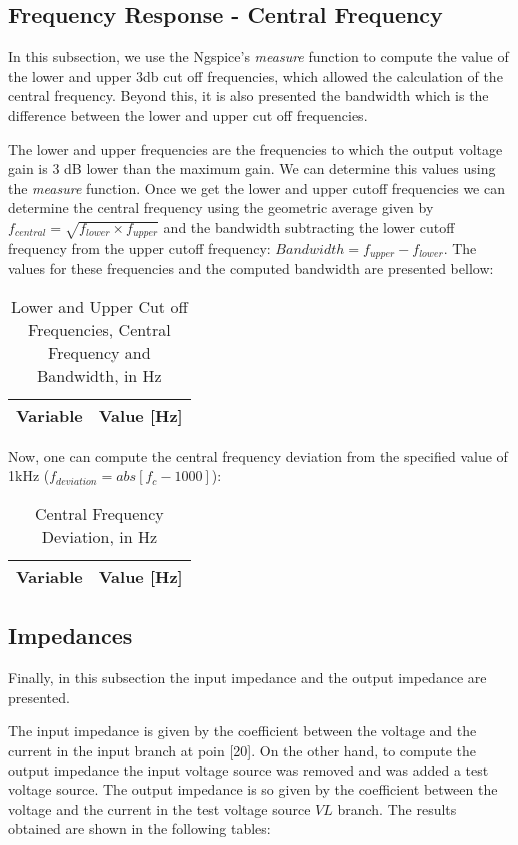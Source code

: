 \subsection{Frequency Response - Central Frequency}
\label{frequency_response}
\par In this subsection, we use the Ngspice's \textit{measure} function to compute the value of the lower and upper 3db cut off frequencies, which allowed the calculation of the central frequency. Beyond this, it is also presented the bandwidth which is the difference between the lower and upper cut off frequencies.
\par The lower and upper frequencies are the frequencies to which the output voltage gain is 3 dB lower than the maximum gain. We can determine this values using the \textit{measure} function. Once we get the lower and upper cutoff frequencies we can determine the central frequency using the geometric average given by $f_{central}=\sqrt{f_{lower}\times f_{upper}}$ and the bandwidth subtracting the lower cutoff frequency from the upper cutoff frequency: $Bandwidth = f_{upper}-f_{lower}$.
The values for these frequencies and the computed bandwidth are presented bellow:

\begin{table}[H]
  \centering
  \begin{tabular}{|l|r|}
    \hline    
    {\bf Variable} & {\bf Value [Hz]} \\ \hline
    
  \end{tabular}
  \caption{Lower and Upper Cut off Frequencies, Central Frequency and Bandwidth, in Hz}
  \label{tab:frequencies}
\end{table}

Now, one can compute the central frequency deviation from the specified value of 1kHz ($f_{deviation}=abs[f_c-1000]$):

\begin{table}[H]
  \centering
  \begin{tabular}{|l|r|}
    \hline    
    {\bf Variable} & {\bf Value [Hz]} \\ \hline
    
  \end{tabular}
  \caption{Central Frequency Deviation, in Hz}
  \label{tab:frequency_dev}
\end{table}


\subsection{Impedances}
\label{impedances}
\par Finally, in this subsection the input impedance and the output impedance are presented.
\par The input impedance is given by the coefficient between the voltage and the current in the input branch at poin [20]. On the other hand, to compute the output impedance the input voltage source was removed and was added a test voltage source. The output impedance is so given by the coefficient between the voltage and the current in the test voltage source $VL$ branch. The results obtained are shown in the following tables:

